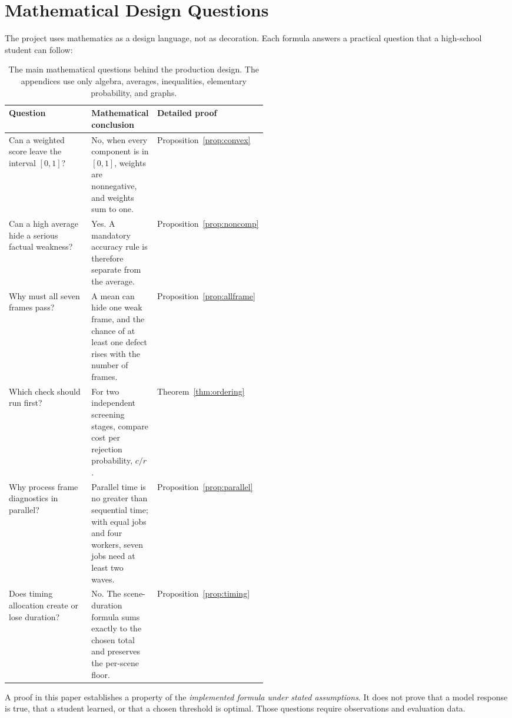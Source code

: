 \documentclass[11pt]{article}
\theoremstyle{plain}
\theoremstyle{definition}
\begin{document}
\section{Mathematical Design Questions}

The project uses mathematics as a design language, not as decoration. Each formula answers a practical question that a high-school student can follow:

\begin{table}[H]
\centering
\small
\begin{tabularx}{\linewidth}{@{}p{0.32\linewidth}Y p{0.19\linewidth}@{}}
\toprule
\textbf{Question} & \textbf{Mathematical conclusion} & \textbf{Detailed proof} \\
\midrule
Can a weighted score leave the interval $[0,1]$? & No, when every component is in $[0,1]$, weights are nonnegative, and weights sum to one. & Proposition~\ref{prop:convex} \\
Can a high average hide a serious factual weakness? & Yes. A mandatory accuracy rule is therefore separate from the average. & Proposition~\ref{prop:noncomp} \\
Why must all seven frames pass? & A mean can hide one weak frame, and the chance of at least one defect rises with the number of frames. & Proposition~\ref{prop:allframe} \\
Which check should run first? & For two independent screening stages, compare cost per rejection probability, $c/r$. & Theorem~\ref{thm:ordering} \\
Why process frame diagnostics in parallel? & Parallel time is no greater than sequential time; with equal jobs and four workers, seven jobs need at least two waves. & Proposition~\ref{prop:parallel} \\
Does timing allocation create or lose duration? & No. The scene-duration formula sums exactly to the chosen total and preserves the per-scene floor. & Proposition~\ref{prop:timing} \\
\bottomrule
\end{tabularx}
\caption{The main mathematical questions behind the production design. The appendices use only algebra, averages, inequalities, elementary probability, and graphs.}
\label{tab:math-roadmap}
\end{table}

A proof in this paper establishes a property of the \emph{implemented formula under stated assumptions}. It does not prove that a model response is true, that a student learned, or that a chosen threshold is optimal. Those questions require observations and evaluation data.
\end{document}
